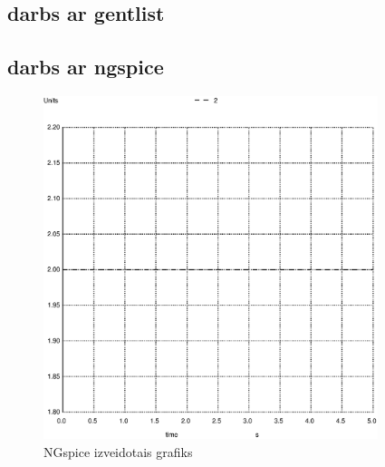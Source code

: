 \documentclass{report}
\begin{document}
\subsection{darbs ar gentlist}


\subsection{darbs ar ngspice}
\begin{figure}[!h]
\includegraphics[widths=10cm, height=10cm]{grafiks.ps}
\caption{NGspice izveidotais grafiks}


\end{figure}
\end{document}
